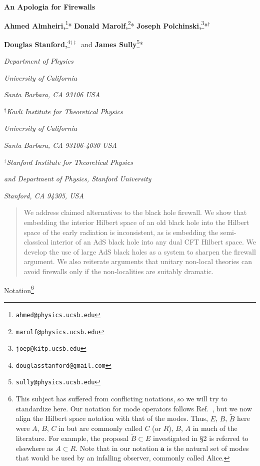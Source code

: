 \documentclass[12pt]{article}
\begin{document}



\begin{titlepage}
\bigskip
\bigskip\bigskip\bigskip
\centerline{\Large \bf An Apologia for Firewalls}



\bigskip\bigskip\bigskip
\bigskip\bigskip\bigskip


 \centerline{{\bf Ahmed Almheiri,}\footnote{\tt ahmed@physics.ucsb.edu}*
 {\bf Donald Marolf,}\footnote{\tt marolf@physics.ucsb.edu}*
 {\bf Joseph Polchinski,}\footnote{\tt joep@kitp.ucsb.edu}*${}^\dagger$}
 \centerline{ {\bf Douglas Stanford,}\footnote{\tt douglasstanford@gmail.com}${}^{\dagger \ddagger}$\
 and {\bf James Sully}\footnote{\tt sully@physics.ucsb.edu}*}
\bigskip
\centerline{\em *Department of Physics}
\centerline{\em University of California}
\centerline{\em Santa Barbara, CA 93106 USA}
\bigskip
\centerline{\em ${}^\dagger$Kavli Institute for Theoretical Physics}
\centerline{\em University of California}
\centerline{\em Santa Barbara, CA 93106-4030 USA}
\bigskip
\centerline{\em ${}^\ddagger$Stanford Institute for Theoretical Physics }
\centerline{\em and Department of Physics, Stanford University}
\centerline{\em Stanford, CA 94305, USA}
\bigskip\bigskip\bigskip



\begin{abstract}

We address claimed alternatives to the black hole firewall.  We show
that embedding the interior Hilbert space of an old black hole into the Hilbert space of the early radiation is inconsistent, as is embedding the semi-classical interior of an AdS black hole into any dual CFT Hilbert space.  We develop the use of large AdS black holes as a system to sharpen the firewall argument.  We also reiterate arguments that unitary non-local theories can avoid firewalls only if the non-localities are suitably dramatic.

\end{abstract}
\end{titlepage}

\tableofcontents
\newpage


\setcounter{footnote}{0}


\bigskip
\centerline{\sc Notation\footnote{\label{DP}This subject has suffered from conflicting notations, so we will try to standardize here.  Our notation for mode operators follows Ref.~\cite{Almheiri:2012rt}, but we now align the Hilbert space notation with that of the modes.  Thus, $E$, $B$, $\tilde B$ here were $A$, $B$, $C$ in \cite{Almheiri:2012rt} but are commonly called $C$ (or $R$), $B$, $A$ in much of the literature.  For example, the proposal $\tilde B \subset E$ investigated in \S2 is referred to elsewhere as $A \subset R$.
Note that in our notation $\bm a$ is the natural set of modes that would be used by an infalling observer, commonly called Alice.}}
\end{document}
